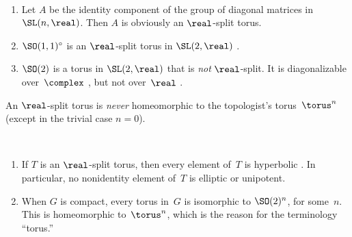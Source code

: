 \begin{egs} \ 
\noprelistbreak 
 \begin{enumerate}
 
 \item Let $A$ be the identity component of the group of
diagonal matrices in $\SL(n,\real)$. Then $A$ is obviously an $\real$-split
torus. 

\item $\SO(1,1)^\circ$ is an $\real$-split torus in $\SL(2,\real)$ .

 \item $\SO(2)$ is a torus in $\SL(2,\real)$ that is \emph{not} $\real$-split. It is diagonalizable over~$\complex$ , but not over~$\real$ .
 \end{enumerate}
 \end{egs}

\begin{warn}
 An $\real$-split torus is \emph{never} homeomorphic
to the topologist's torus~$\torus^n$ (except in the trivial case $n = 0$).
 \end{warn}
 
 \begin{rems} \ 
 \noprelistbreak
 	\begin{enumerate}

	\item If $T$ is an $\real$-split torus, then every element of~$T$ is hyperbolic . In particular, no nonidentity element of~$T$ is elliptic or unipotent.

	\item  When $G$ is compact, every torus in~$G$ is isomorphic to $\SO(2)^n$, for some~$n$. This is homeomorphic to~$\torus^n$, which is the reason for the terminology ``torus\zz.''
 
	\end{enumerate}
 \end{rems}

